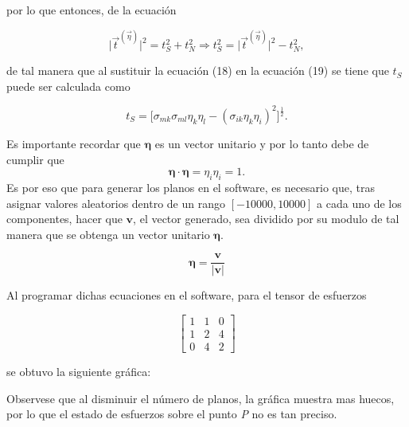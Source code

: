 \documentclass{article}
\begin{document}
    por lo que entonces, de la ecuaci\'{o}n

    \begin{equation}
        \lvert \vec{t}^{(\vec{\eta})} \rvert^2 = t_{S}^2 + t_{N}^2
        \Rightarrow
        t_{S}^2 = \lvert \vec{t}^{(\vec{\eta})} \rvert^2 - t_{N}^2,
    \end{equation}

    de tal manera que al sustituir la ecuaci\'{o}n (18) en la ecuaci\'{o}n (19) se tiene que 
    $t_{S}$ puede ser calculada como

    \begin{equation}
        t_{S} = \lbrack
            \sigma_{mk}\sigma_{ml}\eta_{k}\eta_{l} 
            - (\sigma_{ik}\eta_{k}\eta_{i})^2 
        \rbrack^\frac{1}{2}.
    \end{equation}

    Es importante recordar que $\bm{\eta}$ es un vector unitario y por lo tanto debe de cumplir que
    \begin{equation}
        \bm{\eta}\cdot\bm{\eta} = \eta_{i}\eta_{i} = 1.
    \end{equation}
    Es por eso que para generar los planos en el software, es necesario que, tras asignar valores aleatorios
    dentro de un rango $[-10000, 10000]$ a cada uno de los componentes, hacer que $\bm{v}$, 
    el vector generado, sea dividido por su modulo de tal manera que se obtenga un vector unitario $\bm{\eta}$.

    \begin{equation}
        \bm{\eta} = \frac{\bm{v}}{\lvert \bm{v} \rvert}
    \end{equation}

    Al programar dichas ecuaciones en el software, para el tensor de esfuerzos

    \begin{equation*}
        \begin{bmatrix}
            1 & 1 & 0 \\
            1 & 2 & 4 \\
            0 & 4 & 2
        \end{bmatrix}
    \end{equation*}


    se obtuvo la siguiente gr\'{a}fica:


    Observese que al disminuir el n\'{u}mero de planos, la gr\'{a}fica muestra mas huecos, por
    lo que el estado de esfuerzos sobre el punto \textit{P} no es tan preciso.
\end{document}
